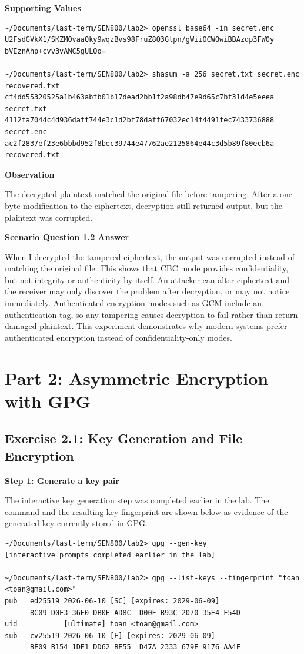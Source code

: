 \documentclass[12pt]{article}
\begin{document}
\textbf{Supporting Values}

\begin{lstlisting}[style=terminal]
~/Documents/last-term/SEN800/lab2> openssl base64 -in secret.enc
U2FsdGVkX1/SKZMOvaaQky9wqzBvs98FruZ8Q3Gtpn/gWiiOCWOwiBBAzdp3FW0y
bVEznAhp+cvv3vANC5gULQo=

~/Documents/last-term/SEN800/lab2> shasum -a 256 secret.txt secret.enc recovered.txt
cf4dd55320525a1b463abfb01b17dead2bb1f2a98db47e9d65c7bf31d4e5eeea  secret.txt
4112fa7044c4d936daff744e3c1d2bf78daff67032ec14f4491fec7433736888  secret.enc
ac2f2837ef23e6bbbd952f8bec39744e47762ae2125864e44c3d5b89f80ecb6a  recovered.txt
\end{lstlisting}

\textbf{Observation}

The decrypted plaintext matched the original file before tampering. After a one-byte modification to the ciphertext, decryption still returned output, but the plaintext was corrupted.

\textbf{Scenario Question 1.2 Answer}

When I decrypted the tampered ciphertext, the output was corrupted instead of matching the original file. This shows that CBC mode provides confidentiality, but not integrity or authenticity by itself. An attacker can alter ciphertext and the receiver may only discover the problem after decryption, or may not notice immediately. Authenticated encryption modes such as GCM include an authentication tag, so any tampering causes decryption to fail rather than return damaged plaintext. This experiment demonstrates why modern systems prefer authenticated encryption instead of confidentiality-only modes.

\section*{Part 2: Asymmetric Encryption with GPG}

\subsection*{Exercise 2.1: Key Generation and File Encryption}

\textbf{Step 1: Generate a key pair}

The interactive key generation step was completed earlier in the lab. The command and the resulting key fingerprint are shown below as evidence of the generated key currently stored in GPG.

\begin{lstlisting}[style=terminal]
~/Documents/last-term/SEN800/lab2> gpg --gen-key
[interactive prompts completed earlier in the lab]

~/Documents/last-term/SEN800/lab2> gpg --list-keys --fingerprint "toan <toan@gmail.com>"
pub   ed25519 2026-06-10 [SC] [expires: 2029-06-09]
      8C09 D0F3 36E0 DB0E AD8C  D00F B93C 2070 35E4 F54D
uid           [ultimate] toan <toan@gmail.com>
sub   cv25519 2026-06-10 [E] [expires: 2029-06-09]
      BF09 B154 1DE1 DD62 BE55  D47A 2333 679E 9176 AA4F
\end{lstlisting}
\end{document}
